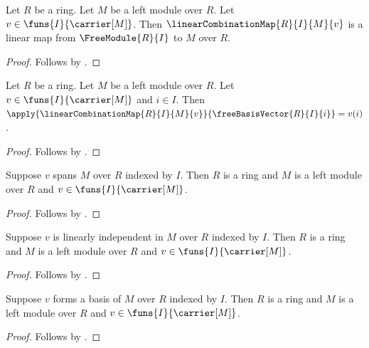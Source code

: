 \begin{proposition}\label{linear_combination_map_linear}
    Let $R$ be a ring.
    Let $M$ be a left module over $R$.
    Let $v\in\funs{I}{\carrier[M]}$.
    Then $\linearCombinationMap{R}{I}{M}{v}$ is a linear map from
        $\FreeModule{R}{I}$ to $M$ over $R$.
\end{proposition}
\begin{proof}
    Follows by .
\end{proof}

\begin{proposition}\label{linear_combination_map_basis_apply}
    Let $R$ be a ring.
    Let $M$ be a left module over $R$.
    Let $v\in\funs{I}{\carrier[M]}$ and $i\in I$.
    Then
        $\apply{\linearCombinationMap{R}{I}{M}{v}}{
            \freeBasisVector{R}{I}{i}}=v(i)$.
\end{proposition}
\begin{proof}
    Follows by
        .
\end{proof}

\begin{proposition}\label{indexed_module_spanning_guards}
    Suppose $v$ spans $M$ over $R$ indexed by $I$.
    Then $R$ is a ring and $M$ is a left module over $R$ and
        $v\in\funs{I}{\carrier[M]}$.
\end{proposition}
\begin{proof}
    Follows by .
\end{proof}

\begin{proposition}\label{indexed_module_linear_independence_guards}
    Suppose $v$ is linearly independent in $M$ over $R$ indexed by $I$.
    Then $R$ is a ring and $M$ is a left module over $R$ and
        $v\in\funs{I}{\carrier[M]}$.
\end{proposition}
\begin{proof}
    Follows by .
\end{proof}

\begin{proposition}\label{indexed_module_basis_guards}
    Suppose $v$ forms a basis of $M$ over $R$ indexed by $I$.
    Then $R$ is a ring and $M$ is a left module over $R$ and
        $v\in\funs{I}{\carrier[M]}$.
\end{proposition}
\begin{proof}
    Follows by .
\end{proof}

